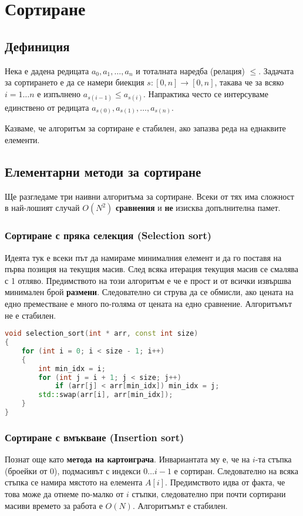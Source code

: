\documentclass[fleqn,12pt]{article}
\begin{document}
\section{Сортиране}
\subsection{Дефиниция}
Нека е дадена редицата $a_0, a_1, \dots, a_n$ и тоталната наредба (релация) $\leq$.
Задачата за сортирането е да се намери биекция $s : [0, n] \rightarrow [0, n]$, такава че 
за всяко $i = 1 \dots n$ е изпълнено $a_{s(i - 1)} \leq a_{s(i)}$.
Напрактика често се интерсуваме единствено от редицата $a_{s(0)}, a_{s(1)}, \dots, a_{s(n)}$.

Казваме, че алгоритъм за сортиране е стабилен, ако запазва реда на еднаквите елементи.

\subsection{Елементарни методи за сортиране}
Ще разгледаме три наивни алгоритъма за сортиране. Всеки от тях има сложност в най-лошият случай $O(N^2)$ \textbf{сравнения} 
и \textbf{не} изисква допълнителна памет.

\subsubsection{Сортиране с пряка селекция (Selection sort)}
Идеята тук е всеки път да намираме минималния елемент и да го поставя на първа позиция на текущия масив.
След всяка итерация текущия масив се смалява с 1 отляво. Предимството на този алгоритъм е че е прост и от всички
извършва минимален брой \textbf{размени}. Следователно си струва да се обмисли, ако цената на едно преместване е
много по-голяма от цената на едно сравнение. Алгоритъмът не е стабилен.

\begin{lstlisting}[language=C++, caption=Selection sort]
void selection_sort(int * arr, const int size)
{
    for (int i = 0; i < size - 1; i++)
    {
        int min_idx = i;
        for (int j = i + 1; j < size; j++) 
            if (arr[j] < arr[min_idx]) min_idx = j;
        std::swap(arr[i], arr[min_idx]);
    }
}
\end{lstlisting}

\subsubsection{Сортиране с вмъкване (Insertion sort)}
Познат още като \textbf{метода на картоиграча}. Инвариантата му е, че на $i$-та стъпка (броейки от 0), подмасивът 
с индекси $0 \dots i - 1$ е сортиран. Следователно на всяка стъпка се намира мястото на елемента $A[i]$. 
Предимството идва от факта, че това може да отнеме по-малко от $i$ стъпки, следователно при почти сортирани масиви
времето за работа е $O(N)$. Алгоритъмът е стабилен.
\end{document}
